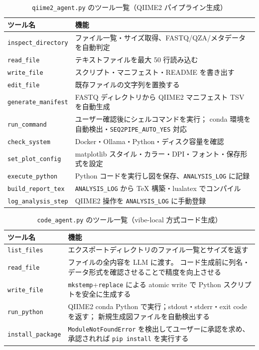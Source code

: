 \documentclass[12pt, a4paper]{article}
\begin{document}
\begin{table}[h]
  \centering
  \caption{\texttt{qiime2\_agent.py} のツール一覧（QIIME2 パイプライン生成）}
  \label{tab:tools_qiime2}
  \begin{tabular}{lp{7cm}}
    \toprule
    \textbf{ツール名} & \textbf{機能} \\
    \midrule
    \texttt{inspect\_directory} &
      ファイル一覧・サイズ取得、FASTQ/QZA/メタデータを自動判定 \\
    \texttt{read\_file} &
      テキストファイルを最大 50 行読み込む \\
    \texttt{write\_file} &
      スクリプト・マニフェスト・README を書き出す \\
    \texttt{edit\_file} &
      既存ファイルの文字列を置換する \\
    \texttt{generate\_manifest} &
      FASTQ ディレクトリから QIIME2 マニフェスト TSV を自動生成 \\
    \texttt{run\_command} &
      ユーザー確認後にシェルコマンドを実行；
      conda 環境を自動検出・\texttt{SEQ2PIPE\_AUTO\_YES} 対応 \\
    \texttt{check\_system} &
      Docker・Ollama・Python・ディスク容量を確認 \\
    \texttt{set\_plot\_config} &
      matplotlib スタイル・カラー・DPI・フォント・保存形式を設定 \\
    \texttt{execute\_python} &
      Python コードを実行し図を保存、\texttt{ANALYSIS\_LOG} に記録 \\
    \texttt{build\_report\_tex} &
      \texttt{ANALYSIS\_LOG} から TeX 構築・lualatex でコンパイル \\
    \texttt{log\_analysis\_step} &
      QIIME2 操作を \texttt{ANALYSIS\_LOG} に手動登録 \\
    \bottomrule
  \end{tabular}
\end{table}

\begin{table}[h]
  \centering
  \caption{\texttt{code\_agent.py} のツール一覧（vibe-local 方式コード生成）}
  \label{tab:tools_code}
  \begin{tabular}{lp{7.5cm}}
    \toprule
    \textbf{ツール名} & \textbf{機能} \\
    \midrule
    \texttt{list\_files} &
      エクスポートディレクトリのファイル一覧とサイズを返す \\
    \texttt{read\_file} &
      ファイルの全内容を LLM に渡す。
      コード生成前に列名・データ形式を確認させることで精度を向上させる \\
    \texttt{write\_file} &
      \texttt{mkstemp}+\texttt{replace} による atomic write で
      Python スクリプトを安全に生成する \\
    \texttt{run\_python} &
      QIIME2 conda Python で実行；stdout・stderr・exit code を返す；
      新規生成図ファイルを自動検出する \\
    \texttt{install\_package} &
      \texttt{ModuleNotFoundError} を検出してユーザーに承認を求め、
      承認されれば \texttt{pip install} を実行する \\
    \bottomrule
  \end{tabular}
\end{table}
\end{document}
